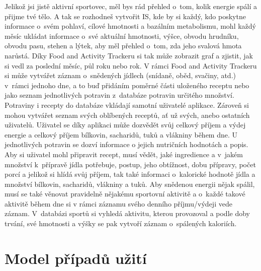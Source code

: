 \documentclass[12pt,a4paper]{article}
\begin{document}
Jelikož jsi jistě aktivní sportovec, měl bys rád přehled o~tom, kolik energie spálí a přijme tvé tělo. A tak se rozhodneš vytvořit IS, kde by si každý, kdo poskytne informace o~svém pohlaví, cílové hmotnosti a bazálním metabolismu, mohl každý měsíc ukládat informace o~své aktuální hmotnosti, výšce, obvodu hrudníku, obvodu pasu, stehen a lýtek, aby měl přehled o~tom, zda jeho svalová hmota narůstá. Díky Food and Activity Trackeru si tak může zobrazit graf a zjistit, jak si vedl za poslední měsíc, půl roku nebo rok. V rámci Food and Activity Trackeru si může vytvářet záznam o~snědených jídlech (snídaně, oběd, svačiny, atd.) v~rámci jednoho dne, a to buď přidáním poměrné části uloženého receptu nebo jako seznam jednotlivých potravin z~databáze potravin určitého množství. Potraviny i recepty do databáze vkládají samotní uživatelé aplikace. Zároveň si mohou vytvářet seznam svých oblíbených receptů, ať už svých, anebo ostatních uživatelů. Uživatel se díky aplikaci může dozvědět svůj celkový příjem a výdej energie a celkový příjem bílkovin, sacharidů, tuků a vlákniny během dne. U jednotlivých potravin se dozví informace o jejich nutričních hodnotách a popis. Aby si uživatel mohl připravit recept, musí vědět, jaké ingredience a v~jakém množství k~přípravě jídla potřebuje, postup, jeho obtížnost, dobu přípravy, počet porcí a jelikož si hlídá svůj příjem, tak také informaci o~kalorické hodnotě jídla a množství bílkovin, sacharidů, vlákniny a tuků. Aby snědenou energii nějak spálil, musí se také věnovat pravidelně nějakému sportovní aktivitě a o~každé takové aktivitě během dne si v rámci záznamu svého denního příjmu/výdeji vede záznam. V~databázi sportů si vyhledá aktivitu, kterou provozoval a podle doby trvání, své hmotnosti a výšky se pak vytvoří záznam o~spálených kaloriích. \\

\newpage

\section{Model případů užití}
\end{document}
